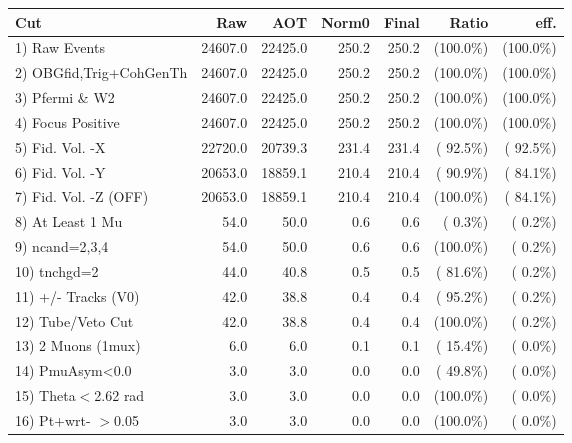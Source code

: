  \begin{table}[h!]\centering
 \begin{tabular}{||l||r|r|r|r|r|r||}
 \hline
 \hline
 Cut & Raw & AOT & Norm0 & Final & Ratio & eff.       \\
 \hline
  1) Raw Events           &      24607.0 &      22425.0 &        250.2 &        250.2 & (100.0\%) & (100.0\%) \\
  2) OBGfid,Trig+CohGenTh &      24607.0 &      22425.0 &        250.2 &        250.2 & (100.0\%) & (100.0\%) \\
  3) Pfermi \& W2         &      24607.0 &      22425.0 &        250.2 &        250.2 & (100.0\%) & (100.0\%) \\
  4) Focus Positive       &      24607.0 &      22425.0 &        250.2 &        250.2 & (100.0\%) & (100.0\%) \\
  5) Fid. Vol. -X         &      22720.0 &      20739.3 &        231.4 &        231.4 & ( 92.5\%) & ( 92.5\%) \\
  6) Fid. Vol. -Y         &      20653.0 &      18859.1 &        210.4 &        210.4 & ( 90.9\%) & ( 84.1\%) \\
  7) Fid. Vol. -Z (OFF)   &      20653.0 &      18859.1 &        210.4 &        210.4 & (100.0\%) & ( 84.1\%) \\
  8) At Least 1 Mu        &         54.0 &         50.0 &          0.6 &          0.6 & (  0.3\%) & (  0.2\%) \\
  9) ncand=2,3,4          &         54.0 &         50.0 &          0.6 &          0.6 & (100.0\%) & (  0.2\%) \\
 10) tnchgd=2             &         44.0 &         40.8 &          0.5 &          0.5 & ( 81.6\%) & (  0.2\%) \\
 11) +/- Tracks (V0)      &         42.0 &         38.8 &          0.4 &          0.4 & ( 95.2\%) & (  0.2\%) \\
 12) Tube/Veto Cut        &         42.0 &         38.8 &          0.4 &          0.4 & (100.0\%) & (  0.2\%) \\
 13) 2 Muons (1mux)       &          6.0 &          6.0 &          0.1 &          0.1 & ( 15.4\%) & (  0.0\%) \\
 14) PmuAsym<0.0          &          3.0 &          3.0 &          0.0 &          0.0 & ( 49.8\%) & (  0.0\%) \\
 15) Theta$<$2.62 rad     &          3.0 &          3.0 &          0.0 &          0.0 & (100.0\%) & (  0.0\%) \\
 16) Pt+wrt- $>$0.05      &          3.0 &          3.0 &          0.0 &          0.0 & (100.0\%) & (  0.0\%) \\

\end{tabular}
\end{table}
